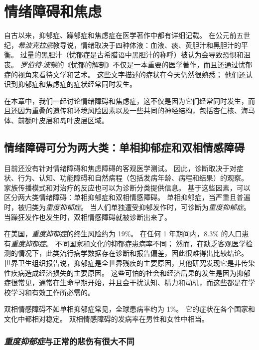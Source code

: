 \chapter{情绪障碍和焦虑} \label{chap:chap61}

自古以来，抑郁症、躁郁症和焦虑症在医学著作中都有详细记载。 
在公元前五世纪，\textit{希波克拉底}教导说，情绪取决于四种体液：血液、痰、黄胆汁和黑胆汁的平衡。
过量的黑胆汁（忧郁症是古希腊语中黑胆汁的称呼）被认为会导致恐惧和沮丧。
\textit{罗伯特$\cdot$波顿}的《忧郁的解剖》不仅是一本重要的医学著作，而且还通过忧郁症的视角来看待文学和艺术。
这些文字描述的症状在今天仍然很熟悉；
他们还认识到抑郁症和焦虑症的症状经常同时发生。


在本章中，我们一起讨论情绪障碍和焦虑症，这不仅是因为它们经常同时发生，而且还因为重叠的遗传和环境风险因素以及一些共同的神经结构，包括杏仁核、海马体、前额叶皮层和岛叶皮层区域。



\section{情绪障碍可分为两大类：单相抑郁症和双相情感障碍}

目前还没有针对情绪障碍和焦虑障碍的客观医学测试。
因此，诊断取决于对症状、行为、认知、功能障碍和自然病程（包括发病年龄、病程和结果）的观察。
家族传播模式和对治疗的反应也可以为诊断分类提供信息。
基于这些因素，可以区分两大类情绪障碍：单相抑郁症和双相情感障碍。
单相抑郁症，当严重且普遍时，被归类为\textit{重度抑郁症}。
当人们单独遭受抑郁发作时，可诊断为\textit{重度抑郁症}。
当躁狂发作也发生时，双相情感障碍就被诊断出来了。


在美国，\textit{重度抑郁症}的终生风险约为 19\%。
在任何 1 年期间内，8.3\% 的人口患有\textit{重度抑郁症}。
不同国家和文化的抑郁症患病率不同；
然而，在缺乏客观医学检测的情况下，此类流行病学数据存在诊断和报告偏差，因此很难得出比较结论。
世界卫生组织报告说，抑郁症是全世界残疾的主要原因，其他研究发现它是非传染性疾病造成经济损失的主要原因。
这些可怕的社会和经济后果的发生是因为抑郁症很常见，通常在生命早期开始，并且会干扰认知、精力和动机，而这些都是在学校学习和有效工作所必需的。


双相情感障碍不如单相抑郁症常见，全球患病率约为 1\%。
它的症状在各个国家和文化中都相对稳定。
双相情感障碍的发病率在男性和女性中相当。



\subsection{\textit{重度抑郁症}与正常的悲伤有很大不同}

